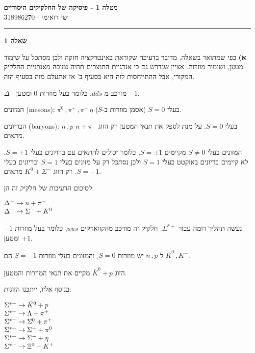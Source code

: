 \documentclass[14pt]{extarticle}
\makeatletter
\newenvironment{lefteqs}{%
    \begin{english}%
    \begin{flushleft}%
    \renewcommand{\arraystretch}{1.3}%
    $\begin{array}{@{}l@{}}%
}{%
    \end{array}$%
    \end{flushleft}%
    \end{english}%
}
\makeatother
\begin{document}
\begin{center}
    {\LARGE \textbf{מטלה 1 - פיסיקה של החלקיקים היסודיים    }}\\[0.5em]
    {\large שי רואימי - 318986270}\\[0.3em]
\end{center}

\hrule
\vspace{2em}

\textbf{\large שאלה 1}

\textbf{א)}
כפי שמתואר בשאלה, מדובר בדעיכה שקוראת באינטרקציה חזקה ולכן מסתכל על שימור מטען, ושימור מוזרות.
אציין שנדרש גם כי אנרגיית התוצרים תהיה נמוכה מאנרגיית החלקיק המקורי,
אבל ההתייחסות לזה היא בסעיף ב' אז אתעלם מזה בסעיף הזה.

$\Delta^-$ מורכב מ-$dds$, כלומר בעל מוזרות $0$ ומטען $-1$.

המזונים (mesons): $\pi^0 \, , \pi^+ \, , \pi^- \, \eta $ בעלי $S=0$ (אסמן מוזרות ב-$S$).

הבריונים (baryons): $n \, , p$ בעלי $S=0$. על מנת לספק את תנאי המטען רק הזוג $n + \pi^-$ מתאים.

המזונים בעלי $S\neq 0$ מקיימים $S=\pm 1$, כלומר יכולים להתאים עם ברויונים בעלי $S=\mp 1$.
לא קיימים בריונים באוקטט בעלי $S=1$ ולכן נסתכל רק על מזונים בעלי $S=1$ ובריונים בעלי $S=-1$.
רק הזוג $K^0 + \Sigma^-$ מתאים.

לסיכום הדעיכות של חלקיק זה הן:
\begin{lefteqs}
    \Delta^- \to n + \pi^- \\
    \Delta^- \to \Sigma^- + K^0
\end{lefteqs}

נעשה תהליך דומה עבור $\Sigma^{*+}$.
חלקיק זה מורכב מהקווארקים $uus$, כלומר בעל מוזרות $-1$ ומטען $+1$.

ל $n\, , p$ יש מוזרות $S=0$, והמזונים בעלי מוזרות $S=-1$ הם $\bar{K}^0 \, , K^-$.

הזוג $\bar{K}^0 + p$ מקיים את תנאי המוזרות והמטען.

בנוסף אליו, ייתכנו הזוגות:
\begin{lefteqs}
    \Sigma^{*+} \to \bar{K}^0 + p \\
    \Sigma^{*+} \to \Lambda + \pi^+ \\
    \Sigma^{*+} \to \Sigma^0 + \pi^+ \\
    \Sigma^{*+} \to \Sigma^+ + \pi^0 \\
    \Sigma^{*+} \to \Sigma^+ + \eta \\
    \Sigma^{*+} \to \Xi^0 + K^+ \\
\end{lefteqs}
\end{document}
